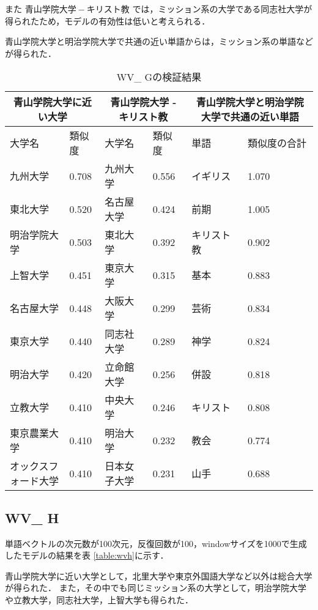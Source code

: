 また $ 青山学院大学 - キリスト教 $ では，ミッション系の大学である同志社大学が得られたため，モデルの有効性は低いと考えられる．

青山学院大学と明治学院大学で共通の近い単語からは，ミッション系の単語などが得られた．
\begin{table}[H]
\caption{WV\_ Gの検証結果}
\centering
\footnotesize
\begin{tabular}{ll|ll|ll}
\hline
\multicolumn{2}{c}{青山学院大学に近い大学} & \multicolumn{2}{c}{青山学院大学 - キリスト教} & \multicolumn{2}{c}{青山学院大学と明治学院大学で共通の近い単語}
\\ \hline
大学名 & 類似度 & 大学名 & 類似度 & 単語 & 類似度の合計
\\ \hline \hline
九州大学 & 0.708 & 九州大学 & 0.556 & イギリス & 1.070\\
東北大学 & 0.520 & 名古屋大学 & 0.424 & 前期 & 1.005\\
明治学院大学 & 0.503 & 東北大学 & 0.392 & キリスト教 & 0.902\\
上智大学 & 0.451 & 東京大学 & 0.315 & 基本 & 0.883\\
名古屋大学 & 0.448 & 大阪大学 & 0.299 & 芸術 & 0.834\\
東京大学 & 0.440 & 同志社大学 & 0.289 & 神学 & 0.824\\
明治大学 & 0.420 & 立命館大学 & 0.256 & 併設 & 0.818\\
立教大学 & 0.410 & 中央大学 & 0.246 & キリスト & 0.808\\
東京農業大学 & 0.410 & 明治大学 & 0.232 & 教会 & 0.774\\
オックスフォード大学 & 0.410 & 日本女子大学 & 0.231 & 山手 & 0.688\\ \hline
\end{tabular}
\label{table:wvg}
\end{table}


\subsection{WV\_ H}
単語ベクトルの次元数が100次元，反復回数が100，windowサイズを1000で生成したモデルの結果を表 \ref{table:wvh}に示す．

青山学院大学に近い大学として，北里大学や東京外国語大学など以外は総合大学が得られた．
また，その中でも同じミッション系の大学として，明治学院大学や立教大学，同志社大学，上智大学も得られた．

